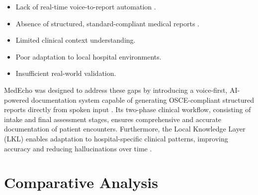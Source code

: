 \begin{itemize}
    \item Lack of real-time voice-to-report automation \cite{radford2023robust}.
    \item Absence of structured, standard-compliant medical reports \cite{json2017standard}.
    \item Limited clinical context understanding.
    \item Poor adaptation to local hospital environments.
    \item Insufficient real-world validation.
\end{itemize}

MedEcho was designed to address these gaps by introducing a voice-first, AI-powered documentation system capable of generating OSCE-compliant structured reports directly from spoken input \cite{achiam2023gpt}. Its two-phase clinical workflow, consisting of intake and final assessment stages, ensures comprehensive and accurate documentation of patient encounters. Furthermore, the Local Knowledge Layer (LKL) enables adaptation to hospital-specific clinical patterns, improving accuracy and reducing hallucinations over time \cite{lewis2020retrieval}.

\section{Comparative Analysis}
\label{sec:lit:comparison}

\begin{table}[H]
\centering
\renewcommand{\arraystretch}{1.35}
\caption{Comparative analysis of clinical documentation systems.}
\label{tab:lit-comparison}
\end{table}

